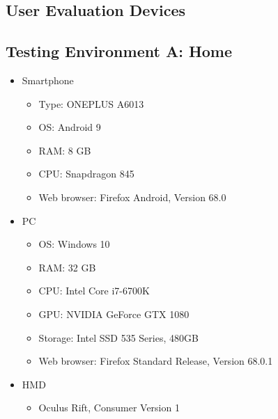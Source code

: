 
\begin{appendices}
  \chapter{User Evaluation Devices}\label{chapter:append-user-eval-devices}
  \section{Testing Environment A: Home}
  \begin{itemize}
    \item Smartphone
    \begin{itemize}
      \item Type: ONEPLUS A6013
      \item \gls{OS}: Android 9
      \item RAM: 8 GB
      \item CPU: Snapdragon 845 %
      \item Web browser: Firefox Android, Version 68.0
    \end{itemize}
    \item \gls{PC}
    \begin{itemize}
      \item \gls{OS}: Windows 10
      \item RAM: 32 GB
      \item CPU: Intel Core i7-6700K %
      \item GPU: NVIDIA GeForce GTX 1080
      \item Storage: Intel SSD 535 Series, 480GB
      \item Web browser: Firefox Standard Release, Version 68.0.1
    \end{itemize}
    \item \gls{HMD}
    \begin{itemize}
      \item Oculus Rift, Consumer Version 1
    \end{itemize}
  \end{itemize}

  \filbreak{}

\end{appendices}
